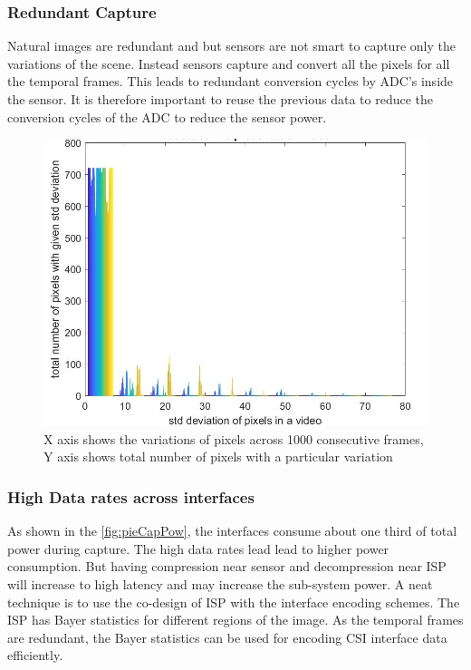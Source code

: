 \subsubsection{Redundant Capture}
Natural images are redundant and but sensors are not smart to capture only the variations of the scene. Instead sensors capture and convert all the pixels for all the temporal frames. This leads to redundant conversion cycles by ADC's inside the sensor. It is therefore important to reuse the previous data to reduce the conversion cycles of the ADC to reduce the sensor power. 
\begin{figure}[h]
	\begin{center}
		\includegraphics[width=1\textwidth]{data/images/Best_case_rio_presentation.jpg}
	\end{center}
	\caption{X axis shows the variations of pixels across 1000 consecutive frames, Y axis shows total number of pixels with a particular variation}	
	\label{fig:sensorRedundancy}
\end{figure} 

\subsubsection{High Data rates across interfaces}
As shown in the \ref{fig:pieCapPow}, the interfaces consume about one third of total power during capture. The high data rates lead lead to higher power consumption. But having compression near sensor and decompression near ISP will increase to high latency and may increase the sub-system power. A neat technique is to use the co-design of ISP with the interface encoding schemes. The ISP has Bayer statistics for different regions of the image. As the temporal frames are redundant, the Bayer statistics can be used for encoding CSI interface data efficiently. 

